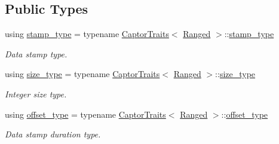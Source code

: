 \subsection*{Public Types}
\begin{DoxyCompactItemize}
\item 
\mbox{\label{classflow_1_1follower_1_1_ranged_acaaecc53baafa375c577f2a96b5b5df1}} 
using \hyperlink{classflow_1_1follower_1_1_ranged_acaaecc53baafa375c577f2a96b5b5df1}{stamp\+\_\+type} = typename \hyperlink{structflow_1_1_captor_traits}{Captor\+Traits}$<$ \hyperlink{classflow_1_1follower_1_1_ranged}{Ranged} $>$\+::\hyperlink{classflow_1_1follower_1_1_ranged_acaaecc53baafa375c577f2a96b5b5df1}{stamp\+\_\+type}
\begin{DoxyCompactList}\small\item\em Data stamp type. \end{DoxyCompactList}\item 
\mbox{\label{classflow_1_1follower_1_1_ranged_a3e6db30b2fbbca0464bd26e55cbd1dc8}} 
using \hyperlink{classflow_1_1follower_1_1_ranged_a3e6db30b2fbbca0464bd26e55cbd1dc8}{size\+\_\+type} = typename \hyperlink{structflow_1_1_captor_traits}{Captor\+Traits}$<$ \hyperlink{classflow_1_1follower_1_1_ranged}{Ranged} $>$\+::\hyperlink{classflow_1_1follower_1_1_ranged_a3e6db30b2fbbca0464bd26e55cbd1dc8}{size\+\_\+type}
\begin{DoxyCompactList}\small\item\em Integer size type. \end{DoxyCompactList}\item 
\mbox{\label{classflow_1_1follower_1_1_ranged_ab117a88915944f22ee67326888858354}} 
using \hyperlink{classflow_1_1follower_1_1_ranged_ab117a88915944f22ee67326888858354}{offset\+\_\+type} = typename \hyperlink{structflow_1_1_captor_traits}{Captor\+Traits}$<$ \hyperlink{classflow_1_1follower_1_1_ranged}{Ranged} $>$\+::\hyperlink{classflow_1_1follower_1_1_ranged_ab117a88915944f22ee67326888858354}{offset\+\_\+type}
\begin{DoxyCompactList}\small\item\em Data stamp duration type. \end{DoxyCompactList}\end{DoxyCompactItemize}
